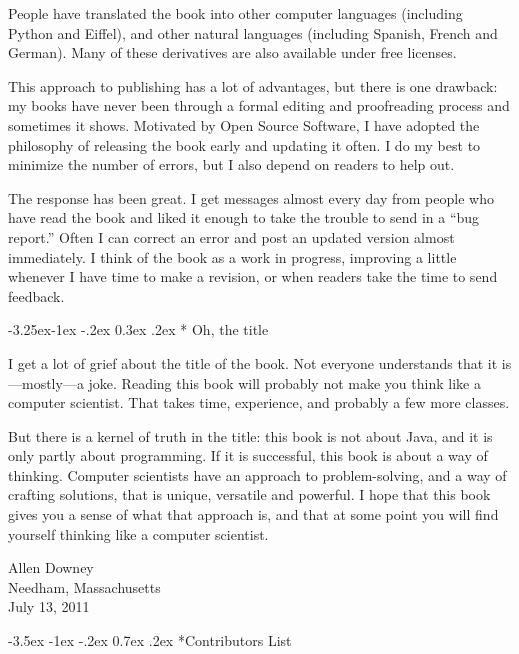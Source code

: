 \documentclass{book}
\makeatletter
\renewcommand{\section}{\@startsection 
    {section} {1} {0mm}%
    {-3.5ex \@plus -1ex \@minus -.2ex}%
    {0.7ex \@plus.2ex}%
    {\normalfont\Large\bfseries}}
\renewcommand\subsection{\@startsection {subsection}{2}{0mm}%
    {-3.25ex\@plus -1ex \@minus -.2ex}%
    {0.3ex \@plus .2ex}%
    {\normalfont\large\bfseries}}
\makeatother
\begin{document}
People have translated the book into other computer languages
(including Python and Eiffel), and other natural languages (including
Spanish, French and German).  Many of these derivatives are also
available under free licenses.

This approach to publishing has a lot of advantages, but there is
one drawback: my books have never been through a formal editing and
proofreading process and sometimes it shows.  Motivated by Open
Source Software, I have adopted the philosophy of releasing the
book early and updating it often.  I do my best to minimize the
number of errors, but I also depend on readers to help out.

The response has been great.  I get messages almost every day from
people who have read the book and liked it enough to take the trouble
to send in a ``bug report.''  Often I can correct an error
and post an updated version almost immediately.  I think of the
book as a work in progress, improving a little whenever I have time
to make a revision, or when readers take the time to send feedback.

\subsection* {Oh, the title}

I get a lot of grief about the title of the book.  Not everyone
understands that it is---mostly---a joke.
Reading this book will probably not make you think like a computer
scientist.  That takes time, experience, and probably a few more
classes.

But there is a kernel of truth in the title: this book is not
about Java, and it is only partly about programming.  If it is
successful, this book is about a way of thinking.  Computer scientists
have an approach to problem-solving, and a way of crafting solutions,
that is unique, versatile and powerful.  I hope that this book
gives you a sense of what that approach is, and that at some
point you will find yourself thinking like a computer scientist.

\vspace{0.2in}

\begin{flushleft}
Allen Downey\\
Needham, Massachusetts\\
July 13, 2011
\end{flushleft}


\section*{Contributors List}
\end{document}
